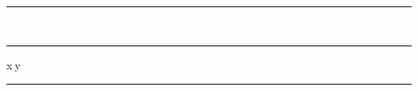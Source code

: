 \documentclass{article}
\begin{document}
\begin{minipage}{\dimexpr 100pt+.16667em\relax}
\rule{45pt}{1pt}\ \ \rule{45.2pt}{1pt}x y

\rule{\linewidth}{1pt}\rlap{\smash{\rule{0.1pt}{2\baselineskip}}}
\end{minipage}
\end{document}
